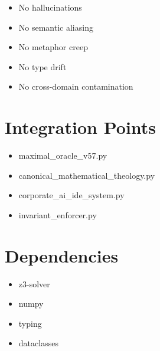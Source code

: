\documentclass[12pt]{article}
\begin{document}
\begin{itemize}
    \item No hallucinations
    \item No semantic aliasing
    \item No metaphor creep
    \item No type drift
    \item No cross-domain contamination
\end{itemize}

\section{Integration Points}

\begin{itemize}
    \item maximal_oracle_v57.py
    \item canonical_mathematical_theology.py
    \item corporate_ai_ide_system.py
    \item invariant_enforcer.py
\end{itemize}

\section{Dependencies}

\begin{itemize}
    \item z3-solver
    \item numpy
    \item typing
    \item dataclasses
\end{itemize}
\end{document}
